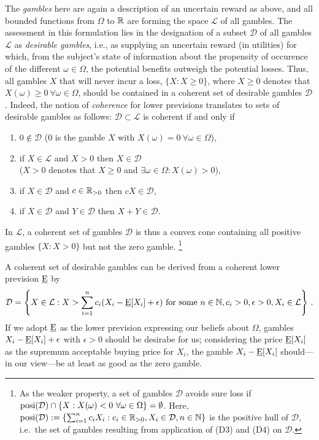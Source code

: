 The \emph{gambles} here are again a description of an uncertain reward as above, 
and all bounded functions from $\Omega$ to $\mathbb{R}$
are forming the space $\mathcal{L}$ of all gambles.
The assessment in this formulation lies in the designation of a subset $\mathcal{D}$
of all gambles $\mathcal{L}$ as \emph{desirable gambles},
i.e., as supplying an uncertain reward (in utilities) for which,
from the subject's state of information
about the propensity of occurence of the different $\omega \in \Omega$,
the potential benefits outweigh the potential losses.
Thus, all gambles $X$ that will never incur a loss,
$\{X: X \ge 0\}$, where $X \ge 0$ denotes that $X(\omega) \ge 0\ \forall \omega \in \Omega$,
should be contained in a coherent set of desirable gambles $\mathcal{D}$.
Indeed, the notion of \emph{coherence} for lower previsions translates to sets of desirable gambles as follows:
$\mathcal{D} \subset \mathcal{L}$ is coherent if and only if
\parencite[p.~137]{2000:walley::towards}
\begin{enumerate}[(D1)]
\item $0 \notin \mathcal{D}$ ($0$ is the gamble $X$ with $X(\omega) = 0\ \forall \omega \in \Omega$),
\item if $X \in \mathcal{L}$ and $X > 0$ then $X \in \mathcal{D}$\\
($X > 0$ denotes that $X \ge 0$ and $\exists \omega \in \Omega: X(\omega) > 0$),
\item if $X \in \mathcal{D}$ and $c \in \mathbb{R}_{>0}$ then $cX \in \mathcal{D}$,
\item if $X \in \mathcal{D}$ and $Y \in \mathcal{D}$ then $X+Y \in \mathcal{D}$.
\end{enumerate}
In $\mathcal{L}$, a coherent set of gambles $\mathcal{D}$ is thus a convex cone
containing all positive gambles $\{X: X > 0\}$ but not the zero gamble.%
\footnote{As the weaker property, a set of gambles $\mathcal{D}$ avoids sure loss
if $\operatorname{posi}(\mathcal{D}) \cap \{X: X(\omega) < 0\ \forall \omega \in \Omega\} = \emptyset$.
Here, $\operatorname{posi}(\mathcal{D}) := \{ \sum_{i=1}^n c_i X_i : c_i \in \mathbb{R}_{>0}, X_i \in \mathcal{D}, n \in \mathbb{N} \}$
is the positive hull of $\mathcal{D}$, 
i.e.\ the set of gambles resulting from application of (D3) and (D4) on $\mathcal{D}$.}

A coherent set of desirable gambles can be derived from a coherent lower prevision $\underline{\operatorname{E}}$ by
\parencite[p.~139]{2000:walley::towards}
\begin{align*}
\mathcal{D} = \left\{ X \in \mathcal{L} :
X > \sum_{i=1}^n c_i (X_i - \underline{\operatorname{E}}[X_i] + \epsilon) \text{ for some } n \in \mathbb{N}, c_i > 0, \epsilon > 0, X_i \in \mathcal{L} \right\}\,.
\end{align*}
If we adopt $\underline{\operatorname{E}}$ as the lower prevision expressing our beliefs about $\Omega$,
gambles $X_i - \underline{\operatorname{E}}[X_i] + \epsilon$ with $\epsilon > 0$ should be desirabe for us;
considering the price $\underline{\operatorname{E}}[X_i]$ as the supremum acceptable buying price for $X_i$,
the gamble $X_i - \underline{\operatorname{E}}[X_i]$ should---in our view---be at least as good as the zero gamble.

